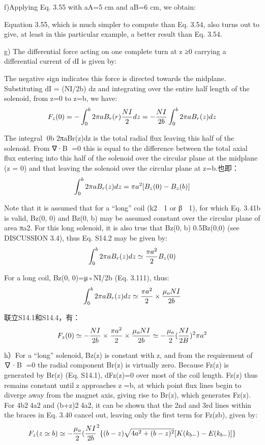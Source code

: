 f)Applying Eq. 3.55 with aA=5 cm and aB=6 cm, we obtain:

Equation 3.55, which is much simpler to compute than Eq. 3.54, also turns out to
give, at least in this particular example, a better result than Eq. 3.54.

g) The differential force acting on one complete turn at z ≥0 carrying a differential current of dI is given by:

The negative sign indicates this force is directed towards the midplane. Substituting dI = (NI/2b) dz and integrating over the entire half length of the solenoid,
from z=0 to z=b, we have:
$$
F_{z}(0)=-\int_{0}^{b}2\pi aB_{r}(r)\frac{NI}{2}dz=-\frac{NI}{2b}\int_{0}^{b}2\pi aB_{r}(z)dz\\%
$$

The integral 0b 2πaBr(z)dz is the total radial flux leaving this half of the solenoid.
From ∇·B =0 this is equal to the difference between the total axial flux entering
into this half of the solenoid over the circular plane at the midplane (z = 0) and
that leaving the solenoid over the circular plane at z=b.也即：
$$
\int_{0}^{b}2\pi aB_{r}(z)dz=\pi a^{2}[B_{z}(0)-B_{z}(b)]\\%
$$

Note that it is assumed that for a “long” coil (k2  1 or β  1), for which
Eq. 3.41b is valid, Bz(0, 0) and Bz(0, b) may be assumed constant over the circular
plane of area πa2. For this long solenoid, it is also true that Bz(0, b)  0.5Bz(0,0)
(see DISCUSSION 3.4), thus Eq. S14.2 may be given by:
$$
\int_{0}^{b}2\pi aB_{r}(z)dz\simeq\frac{\pi a^{2}}{2}B_{z}(0)\\%
$$

For a long coil, Bz(0, 0)=μ◦NI/2b (Eq. 3.111), thus:
$$
\int_{0}^{b}2\pi aB_{r}(z)dz\simeq\frac{\pi a^{2}}{2}\times\frac{\mu_{o}NI}{2b}\\%
$$

联立S14.1和S14.4，有：
$$
F_{z}(0)\simeq-\frac{NI}{2b}\times\frac{\pi a^{2}}{2}\times\frac{\mu_{o}NI}{2b}\simeq-\frac{\mu_{o}}{2}(\frac{NI}{2B})^{2}\pi a^{2}\\%
$$

h）For a “long” solenoid, Bz(z) is constant with z, and from the requirement of
∇·B =0 the radial component Br(z) is virtually zero. Because Fz(z) is generated
by Br(z) (Eq. S14.1), dFz(z)=0 over most of the coil length. Fz(z) thus remains
constant until z approaches z =b, at which point flux lines begin to diverge away
from the magnet axis, giving rise to Br(z), which generates Fz(z). For 4b24a2
and (b+z)24a2, it can be shown that the 2nd and 3rd lines within the braces in
Eq. 3.40 cancel out, leaving only the first term for Fz(zb), given by:
$$
F_{z}(z\simeq b)\simeq-\frac{\mu_{o}}{2}(\frac{NI}{2b}^{2}\{(b-z)\sqrt{4a^{2}+(b-z)^{2}}[K(k_{b-})-E(k_{b-})]\}\\%
$$

